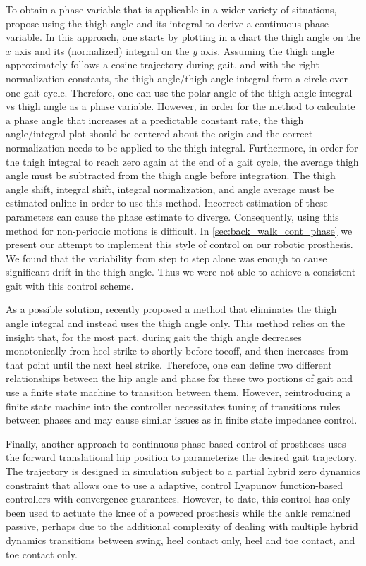 To obtain a phase variable that is applicable in a wider variety of situations,
\citet{quintero2016preliminary} propose using the thigh angle and its integral
to derive a continuous phase variable. In this approach, one starts by plotting
in a chart the thigh angle on the $x$ axis and its (normalized) integral on the
$y$ axis. Assuming the thigh angle approximately follows a cosine trajectory
during gait, and with the right normalization constants, the thigh angle/thigh
angle integral form a circle over one gait cycle. Therefore, one can use the
polar angle of the thigh angle integral vs thigh angle as a phase variable.
However, in order for the method to calculate a phase angle that increases at a
predictable constant rate, the thigh angle/integral plot should be centered
about the origin and the correct normalization needs to be applied to the thigh
integral.  Furthermore, in order for the thigh integral to reach zero again at
the end of a gait cycle, the average thigh angle must be subtracted from the
thigh angle before integration. The thigh angle shift, integral shift, integral
normalization, and angle average must be estimated online in order to use this
method. Incorrect estimation of these parameters can cause the phase estimate to
diverge. Consequently, using this method for non-periodic motions is difficult.
In \cref{sec:back_walk_cont_phase} we present our attempt to implement this
style of control on our robotic prosthesis. We found that the variability from
step to step alone was enough to cause significant drift in the thigh angle.
Thus we were not able to achieve a consistent gait with this control scheme.

As a possible solution, \citet{rezazadeh2018phase} recently proposed a method
that eliminates the thigh angle integral and instead uses the thigh angle only.
This method relies on the insight that, for the most part, during gait the thigh
angle decreases monotonically from heel strike to shortly before toeoff, and
then increases from that point until the next heel strike. Therefore, one can
define two different relationships between the hip angle and phase for these two
portions of gait and use a finite state machine to transition between them.
However, reintroducing a finite state machine into the controller necessitates
tuning of transitions rules between phases and may cause similar issues as in
finite state impedance control.

\citet{azimi2019model} Finally, another approach to continuous phase-based
control of prostheses uses the forward translational hip position to
parameterize the desired gait trajectory. The trajectory is designed in
simulation subject to a partial hybrid zero dynamics constraint that allows one
to use a adaptive, control Lyapunov function-based controllers with convergence
guarantees. However, to date, this control has only been used to actuate the
knee of a powered prosthesis while the ankle remained passive, perhaps due to
the additional complexity of dealing with multiple hybrid dynamics transitions
between swing, heel contact only, heel and toe contact, and toe contact only.

